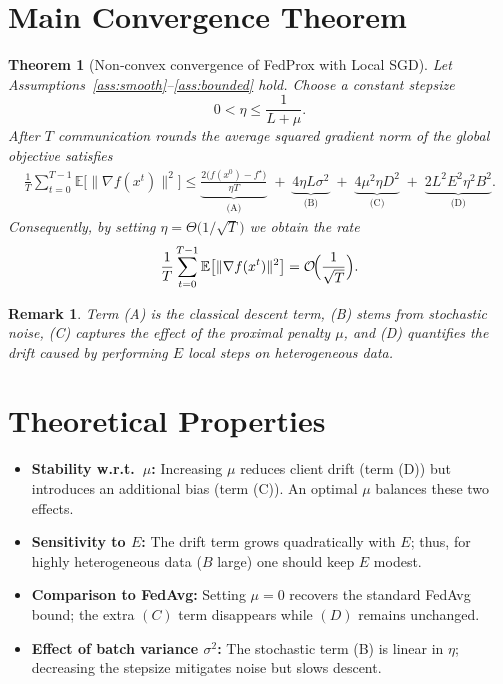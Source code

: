 \documentclass{article}
\newtheorem{theorem}{Theorem}[section]
\newtheorem{remark}{Remark}[section]
\begin{document}
\section*{Main Convergence Theorem}
\begin{theorem}[Non‑convex convergence of FedProx with Local SGD]\label{thm:main}
Let Assumptions~\ref{ass:smooth}–\ref{ass:bounded} hold.  
Choose a constant stepsize
\[
0<\eta\le\frac{1}{L+\mu}.
\]
After $T$ communication rounds the average squared gradient norm of the global objective satisfies
\begin{align}
\frac{1}{T}\sum_{t=0}^{T-1}
\mathbb{E}\bigl[\|\nabla f(x^{t})\|^{2}\bigr]
\le
\underbrace{\frac{2\bigl(f(x^{0})-f^{\star}\bigr)}{\eta T}}_{\text{(A)}}
\;+\;
\underbrace{4\eta L\sigma^{2}}_{\text{(B)}}
\;+\;
\underbrace{4\mu^{2}\eta D^{2}}_{\text{(C)}}
\;+\;
\underbrace{2L^{2}E^{2}\eta^{2}B^{2}}_{\text{(D)}} .
\label{eq:rate}
\end{align}
Consequently, by setting $\eta= \Theta\!\bigl(1/\sqrt{T}\bigr)$ we obtain the rate
\[
\frac{1}{T}\sum_{t=0}^{T-1}\mathbb{E}\bigl[\|\nabla f(x^{t})\|^{2}\bigr]
 =\mathcal{O}\!\Bigl(\frac{1}{\sqrt{T}}\Bigr).
\]
\end{theorem}

\begin{remark}
Term (A) is the classical descent term, (B) stems from stochastic noise, (C) captures the effect of the proximal penalty $\mu$, and (D) quantifies the drift caused by performing $E$ local steps on heterogeneous data.
\end{remark}

\section*{Theoretical Properties}
\begin{itemize}
    \item \textbf{Stability w.r.t.\ $\mu$:} Increasing $\mu$ reduces client drift (term (D)) but introduces an additional bias (term (C)). An optimal $\mu$ balances these two effects.
    \item \textbf{Sensitivity to $E$:} The drift term grows quadratically with $E$; thus, for highly heterogeneous data ($B$ large) one should keep $E$ modest.
    \item \textbf{Comparison to FedAvg:} Setting $\mu=0$ recovers the standard FedAvg bound; the extra $(C)$ term disappears while $(D)$ remains unchanged.
    \item \textbf{Effect of batch variance $\sigma^{2}$:} The stochastic term (B) is linear in $\eta$; decreasing the stepsize mitigates noise but slows descent.
\end{itemize}
\end{document}
